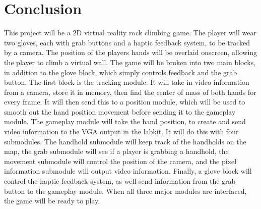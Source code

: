 \section{Conclusion}
\label{sec:conclusion}

This project will be a 2D virtual reality rock climbing game. The player will wear two gloves, each with grab buttons and a haptic feedback system, to be tracked by a camera. The position of the players hands will be overlaid onscreen, allowing the player to climb a virtual wall. The game will be broken into two main blocks, in addition to the glove block, which simply controls feedback and the grab button. The first block is the tracking module. It will take in video information from a camera, store it in memory, then find the center of mass of both hands for every frame. It will then send this to a position module, which will be used to smooth out the hand position movement before sending it to the gameplay module. The gameplay module will take the hand position, to create and send video information to the VGA output in the labkit. It will do this with four submodules. The handhold submodule will keep track of the handholds on the map, the grab submodule will see if a player is grabbing a handhold, the movement submodule will control the position of the camera, and the pixel information submodule will output video information. Finally, a glove block will control the haptic feedback system, as well send information from the grab button to the gameplay module. When all three major modules are interfaced, the game will be ready to play. 
